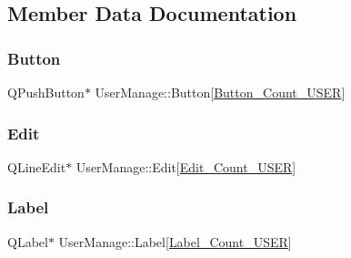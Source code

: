 \subsection{Member Data Documentation}
\mbox{\label{class_user_manage_a625f34397b886a9c18dd7aebd407d2be}} 
\subsubsection{\texorpdfstring{Button}{Button}}
{\footnotesize\ttfamily Q\+Push\+Button$\ast$ User\+Manage\+::\+Button\mbox{[}\mbox{\hyperlink{usermanage_8h_abdbae7de651447e47cae67dd821a74fb}{Button\+\_\+\+Count\+\_\+\+U\+S\+ER}}\mbox{]}\hspace{0.3cm}{\ttfamily [private]}}

\mbox{\label{class_user_manage_aeaa85bb35113ad746d23b0b43b1043bc}} 
\subsubsection{\texorpdfstring{Edit}{Edit}}
{\footnotesize\ttfamily Q\+Line\+Edit$\ast$ User\+Manage\+::\+Edit\mbox{[}\mbox{\hyperlink{usermanage_8h_ad566d7b39279371cb1144d506523f783}{Edit\+\_\+\+Count\+\_\+\+U\+S\+ER}}\mbox{]}\hspace{0.3cm}{\ttfamily [private]}}

\mbox{\label{class_user_manage_a4a35260a19fd01d67f4d5e8f76aa1865}} 
\subsubsection{\texorpdfstring{Label}{Label}}
{\footnotesize\ttfamily Q\+Label$\ast$ User\+Manage\+::\+Label\mbox{[}\mbox{\hyperlink{usermanage_8h_abc2d44d68135265538a4352d526067e8}{Label\+\_\+\+Count\+\_\+\+U\+S\+ER}}\mbox{]}\hspace{0.3cm}{\ttfamily [private]}}

\mbox{\label{class_user_manage_ac57f61d7f531b5a48253482ba9493199}} 
